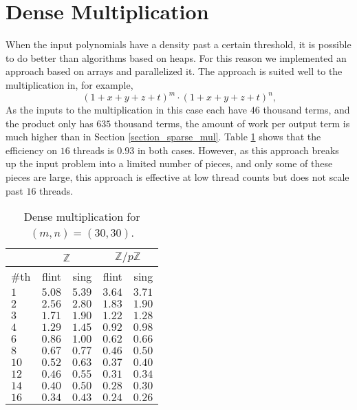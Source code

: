 \documentclass{deliverablereport}
\begin{document}
\section{Dense Multiplication}
\label{section_dense_mul}
When the input polynomials have a density past a certain threshold, it is possible to do better than algorithms based on heaps. For this reason we implemented an approach based on arrays and parallelized it. The approach is suited well to the multiplication in, for example,
\begin{equation*}
(1+x+y+z+t)^m \cdot (1+x+y+z+t)^n\text{,}
\end{equation*}
As the inputs to the multiplication in this case each have $46$ thousand terms, and the product only has $635$ thousand terms, the amount of work per output term is much higher than in Section \ref{section_sparse_mul}. Table \ref{table_dense_mul} shows that the efficiency on $16$ threads is $0.93$ in both cases. However, as this approach breaks up the input problem into a limited number of pieces, and only some of these pieces are large, this approach is effective at low thread counts but does not scale past $16$ threads. 

\begin{table}
\begin{tabular}{l | r | r | r | r | }
& \multicolumn{2}{|c|}{$\mathbb{Z}$} & \multicolumn{2}{|c|}{$\mathbb{Z}/p \mathbb{Z}$} \\ \hline
\#th   & flint & sing & flint & sing\\ \hline
$1$   & $5.08$ & $5.39$ &$3.64$ & $3.71$\\ \hline
$2$   & $2.56$ & $2.80$ &$1.83$ & $1.90$\\ \hline
$3$   & $1.71$ & $1.90$ &$1.22$ & $1.28$\\ \hline
$4$   & $1.29$ & $1.45$ &$0.92$ & $0.98$\\ \hline
$6$   & $0.86$ & $1.00$ &$0.62$ & $0.66$\\ \hline
$8$   & $0.67$ & $0.77$ &$0.46$ & $0.50$\\ \hline
$10$  & $0.52$ & $0.63$ &$0.37$ & $0.40$\\ \hline
$12$  & $0.46$ & $0.55$ &$0.31$ & $0.34$\\ \hline
$14$  & $0.40$ & $0.50$ &$0.28$ & $0.30$\\ \hline
$16$  & $0.34$ & $0.43$ &$0.24$ & $0.26$\\ \hline
\end{tabular}
\caption{Dense multiplication for $(m, n) = (30, 30)$.}
\label{table_dense_mul}
\end{table}
\end{document}
